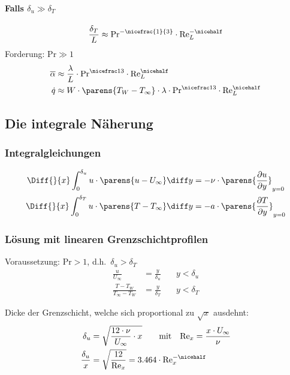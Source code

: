 			\paragraph{Falls $\delta_u \gg \delta_T$} %
				\[
					\frac{\delta_T}{L} \approx \mathrm{Pr}^{- \nicefrac{1}{3}} \cdot \mathrm{Re}_L^{-\nicehalf}
				\]
				Forderung: $\mathrm{Pr} \gg 1$
				\begin{align*}
					\overline\alpha &\approx \frac \lambda L \cdot \mathrm{Pr}^{\nicefrac 1 3} \cdot \mathrm{Re}_L^{\nicehalf} \\
					\dot q &\approx W \cdot \parens{T_W - T_\infty} \cdot \lambda \cdot \mathrm{Pr}^{\nicefrac 1 3} \cdot \mathrm{Re}_L^{\nicehalf}
				\end{align*}

	\subsection{Die integrale Näherung} %
		\subsubsection{Integralgleichungen} %
			\begin{align*}
				\Diff{}{x} \int_0^{\delta_u} u \cdot \parens{ u - U_\infty } \diff y &= - \nu \cdot \parens{ \frac{\partial u}{\partial y} }_{y=0} \\
				\Diff{}{x} \int_0^{\delta_T} u \cdot \parens{ T - T_\infty } \diff y &= - a \cdot \parens{ \frac{\partial T}{\partial y} }_{y=0}
			\end{align*}

		\subsubsection{Lösung mit linearen Grenzschichtprofilen} %
			Voraussetzung: $\mathrm{Pr} > 1$, d.h.~$\delta_u > \delta_T$
			\begin{align*}
				\frac{u}{U_\infty} &= \frac{y}{\delta_u} \quad & y<\delta_u \\
				\frac{T-T_W}{T_\infty-T_W} &= \frac{y}{\delta_T} \quad & y<\delta_T
			\end{align*}

			Dicke der Grenzschicht, welche sich proportional zu $\sqrt x$ ausdehnt:
			\begin{align*}
				\delta_u &= \sqrt{\frac{12 \cdot \nu}{U_\infty} \cdot x} \qquad \text{mit} \quad \mathrm{Re}_x = \frac{x \cdot U_\infty}{\nu} \\
				\frac {\delta_u} x &= \sqrt{\frac{12}{\mathrm{Re}_x}} = 3.464 \cdot \mathrm{Re}_x^{-\nicehalf}
			\end{align*}

